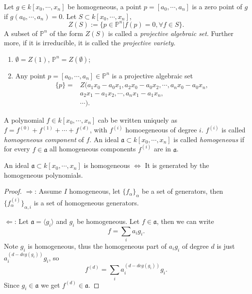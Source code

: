 \begin{definition}
	Let $ g\in k[x_0,\cdots,x_n] $ be homogeneous, a point $ p=[a_0,\cdots,a_n] $ is a zero point of $ g $ if $ g(a_0,\cdots,a_n)=0 $. Let $ S\subset k[x_0,\cdots,x_n] $,
	\begin{equation}
		Z(S):=\{ p\in\mathbb{P}^n|f(p)=0 ,\forall f\in S \}.
	\end{equation}
	A subset of $ \mathbb{P}^n $ of the form $ Z(S) $ is called a \textit{projective algebraic set}. Further more, if it is irreducible, it is called the \textit{projective variety}.
\end{definition}
\begin{example}
	\begin{enumerate}
		\item $ \emptyset=Z(1) $, $ \mathbb{P}^n=Z(\emptyset) $;
		\item Any point $ p=[a_0,\cdots,a_n]\in\mathbb{P}^n $ is a projective algebraic set
		      $$\begin{array}{cc}
				      \{ p \}= & Z(a_1x_0-a_0x_1,a_2x_0-a_0x_2,\cdots,a_nx_0-a_0x_n, \\
				      {}       & a_2x_1-a_1x_2,\cdots,a_nx_1-a_1x_n,                 \\
				      {}       & \cdots).
			      \end{array}$$
	\end{enumerate}
\end{example}
\begin{definition}
	A polynomial $ f\in k[x_0,\cdots,x_n] $ cab be written uniquely as $ f=f^{(0)}+f^{(1)}+\cdots+ f^{(d)} $, with $ f^{(i)} $ homoegeneous of degree $ i $. $ f^{(i)} $ is called \textit{homogeneous component} of $ f $. An ideal $ \mathfrak{a}\subset k[x_0,\cdots,x_n] $ is called \textit{homogeneous} if for every $ f\in \mathfrak{a} $ all homogeneous components $ f^{(i)} $ are in $ \mathfrak{a} $.
\end{definition}
\begin{proposition}
	An ideal $ \mathfrak{a}\subset k[x_0,\cdots,x_n] $ is homogeneous $ \Leftrightarrow $ It is generated by the homogeneous polynomials.
\end{proposition}
\begin{proof}
	$ \Rightarrow $: Assume $ I $ homogeneous, let $ \{f_\alpha\}_\alpha $ be a set of generators, then $ \{f^{(i)}_\alpha\}_{\alpha,i} $ is a set of homogeneous generators.

	$ \Leftarrow $: Let $ \mathfrak{a} =\langle g_i\rangle $ and $ g_i $ be homogeneous. Let $ f\in \mathfrak{a}$, then we can write
	\begin{equation}
		f=\sum\limits_{i}a_ig_i.
	\end{equation}
	Note $ g_i $ is homogeneous, thus the homogeneous part of $ a_ig_i $ of degree $ d $ is just $ a_i^{(d-deg(g_i))}g_i $, so
	\begin{equation}
		f^{(d)}=\sum\limits_{i} a_i^{(d-deg(g_i))}g_i.
	\end{equation}
	Since $ g_i\in \mathfrak{a} $ we get $ f^{(d)}\in \mathfrak{a} $.
\end{proof}
